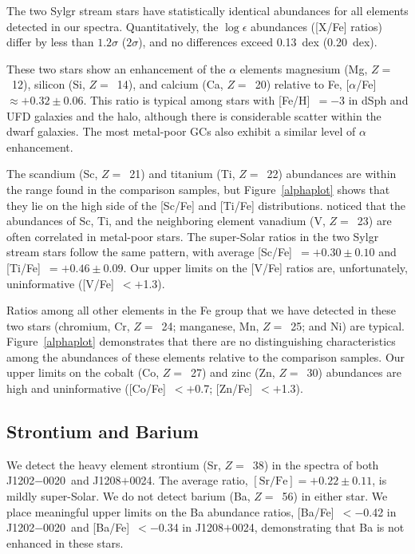 \documentclass[twocolumn,tighten]{aastex62}
\newcommand{\jtwo}{J1202$-$0020}
\newcommand{\jeight}{J1208$+$0024}
\begin{document}
The two Sylgr stream stars have statistically
identical abundances for all elements detected in our spectra.
Quantitatively, the 
$\log\epsilon$ abundances ([X/Fe] ratios)
differ by less than $1.2\sigma$ ($2\sigma$),
and no differences exceed 0.13~dex (0.20~dex).

These two stars show an enhancement of the $\alpha$ elements
magnesium (Mg, $Z =$~12), 
silicon (Si, $Z =$~14), and 
calcium (Ca, $Z =$~20) relative to Fe,
[$\alpha$/Fe]~$\approx +0.32 \pm 0.06$.
This ratio is typical among
stars with [Fe/H]~$= -$3 in dSph and UFD galaxies and the halo,
although there is considerable scatter 
within the dwarf galaxies.
The most metal-poor GCs 
also exhibit a similar level of $\alpha$ enhancement.

The scandium (Sc, $Z =$~21) and titanium (Ti, $Z =$~22) abundances
are within the range found in
the comparison samples, but Figure~\ref{alphaplot} shows that
they lie on the high side
of the [Sc/Fe] and [Ti/Fe] distributions.
\citet{sneden16} noticed that the abundances of 
Sc, Ti, and the neighboring element vanadium (V, $Z =$~23)
are often
correlated in metal-poor stars.
The super-Solar ratios in the
two Sylgr stream stars follow the same pattern, 
with average [Sc/Fe]~$= +0.30 \pm 0.10$ and 
[Ti/Fe]~$= +0.46 \pm 0.09$.
Our upper limits on the [V/Fe] ratios are,
unfortunately, uninformative
([V/Fe]~$< +$1.3).

Ratios among all other elements in the Fe group that we have detected
in these two stars
(chromium, Cr, $Z =$~24; 
manganese, Mn, $Z =$~25; and Ni)
are typical.
Figure~\ref{alphaplot} demonstrates that 
there are no distinguishing characteristics among the
abundances of these elements relative to the comparison samples.
Our upper limits on the cobalt (Co, $Z =$~27) and
zinc (Zn, $Z =$~30) abundances
are high and uninformative
([Co/Fe]~$< +$0.7; [Zn/Fe]~$< +$1.3).


\subsection{Strontium and Barium}
\label{srba}


We detect the heavy element strontium (Sr, $Z =$~38) 
in the spectra of both \jtwo\ and \jeight.
The average ratio,
$\mathrm{[Sr/Fe]}=+0.22 \pm 0.11$,
is mildly super-Solar.
We do not detect barium (Ba, $Z =$~56) in either star.
We place
meaningful upper limits on the Ba abundance ratios,
[Ba/Fe]~$< -$0.42 in \jtwo\ and [Ba/Fe]~$< -$0.34 in \jeight,
demonstrating that Ba is not enhanced in these stars.
\end{document}

